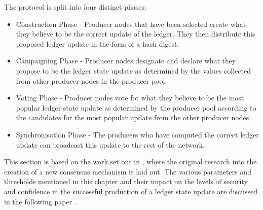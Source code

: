 The protocol is split into four distinct phases:

\begin{itemize}

\item Construction Phase - Producer nodes that have been selected create what they believe to be the correct update of the ledger. They then distribute this proposed ledger update in the form of a hash digest.
\item Campaigning Phase - Producer nodes designate and declare what they propose to be the ledger state update as determined by the values collected from other producer nodes in the producer pool.
\item Voting Phase - Producer nodes vote for what they believe to be the most popular ledger state update as determined by the producer pool according to the candidates for the most popular update from the other producer nodes.
\item Synchronisation Phase - The producers who have computed the correct ledger update can broadcast this update to the rest of the network.

\end{itemize}

This section is based on the work set out in \cite{Rasicaresearch}, where the original research into the creation of a new consensus mechanism is laid out. The various parameters and thresholds mentioned in this chapter and their impact on the levels of security and confidence in the successful production of a ledger state update are discussed in the following paper \cite{Rasicaresearch2}.
